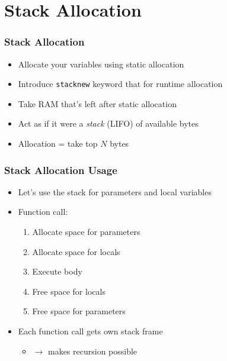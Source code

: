 \section{Stack Allocation}

\begin{frame}
  \tableofcontents[currentsection]
\end{frame}

\begin{frame}
  \frametitle{Stack Allocation}
  \begin{itemize}
    \item Allocate your variables using static allocation
    \item Introduce {\tt stacknew} keyword that for runtime allocation
    \item Take RAM that's left after static allocation
    \item Act as if it were a \emph{stack} (LIFO) of available bytes
    \item Allocation = take top $N$ bytes
  \end{itemize}
  \vskip5mm
  \begin{center}
  \end{center}
\end{frame}

\begin{frame}
  \frametitle{Stack Allocation Usage}
  \begin{itemize}
    \item Let's use the stack for parameters and local variables
    \item Function call:
          \begin{enumerate}
            \item Allocate space for parameters
            \item Allocate space for locals
            \item Execute body
            \item Free space for locals
            \item Free space for parameters
          \end{enumerate}
    \item Each function call gets own stack frame
          \begin{itemize}
            \item $\rightarrow$ makes recursion possible
          \end{itemize}
  \end{itemize}
\end{frame}



